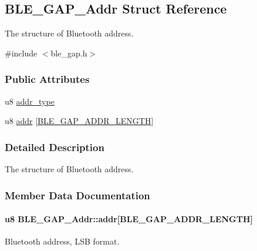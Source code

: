 \hypertarget{struct_b_l_e___g_a_p___addr}{}\subsection{B\+L\+E\+\_\+\+G\+A\+P\+\_\+\+Addr Struct Reference}
\label{struct_b_l_e___g_a_p___addr}


The structure of Bluetooth address.  




{\ttfamily \#include $<$ble\+\_\+gap.\+h$>$}

\subsubsection*{Public Attributes}
\begin{DoxyCompactItemize}
\item 
u8 \hyperlink{struct_b_l_e___g_a_p___addr_a851bd81d3d495b21b2dea2d4e7efffe8}{addr\+\_\+type}
\item 
u8 \hyperlink{struct_b_l_e___g_a_p___addr_a87743aef3f618003ef8835f8c48e7959}{addr} \mbox{[}\hyperlink{group___b_l_e___g_a_p_gac59af0a1a5d256432e9d01cdcd35215d}{B\+L\+E\+\_\+\+G\+A\+P\+\_\+\+A\+D\+D\+R\+\_\+\+L\+E\+N\+G\+TH}\mbox{]}
\end{DoxyCompactItemize}


\subsubsection{Detailed Description}
The structure of Bluetooth address. 

\subsubsection{Member Data Documentation}
\paragraph[{\texorpdfstring{addr}{addr}}]{\setlength{\rightskip}{0pt plus 5cm}u8 B\+L\+E\+\_\+\+G\+A\+P\+\_\+\+Addr\+::addr\mbox{[}{\bf B\+L\+E\+\_\+\+G\+A\+P\+\_\+\+A\+D\+D\+R\+\_\+\+L\+E\+N\+G\+TH}\mbox{]}}\hypertarget{struct_b_l_e___g_a_p___addr_a87743aef3f618003ef8835f8c48e7959}{}\label{struct_b_l_e___g_a_p___addr_a87743aef3f618003ef8835f8c48e7959}
Bluetooth address, L\+SB format. 

